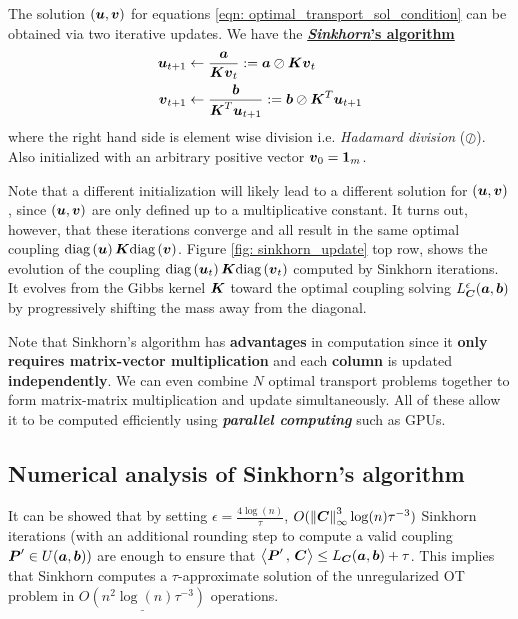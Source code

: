 \documentclass[11pt]{article}
\begin{document}
The solution $(\boldsymbol{u}, \boldsymbol{v})$ for equations \eqref{eqn: optimal_transport_sol_condition} can be obtained via two iterative updates. We have the \underline{\textbf{\emph{Sinkhorn}'s algorithm}} \citep{sinkhorn1967diagonal}
\begin{align}
\boldsymbol{u}_{t+1} &\leftarrow \frac{\boldsymbol{a}}{\boldsymbol{K}\boldsymbol{v}_{t}} := \boldsymbol{a}\oslash \boldsymbol{K}\boldsymbol{v}_{t} \label{eqn: sinkhorn_u}\\
\boldsymbol{v}_{t+1} &\leftarrow \frac{\boldsymbol{b}}{\boldsymbol{K}^{T}\boldsymbol{u}_{t+1}} :=\boldsymbol{b}\oslash \boldsymbol{K}^{T}\boldsymbol{u}_{t+1}   \label{eqn: sinkhorn_v}
\end{align} where the right hand side is element wise division i.e.  \emph{Hadamard division} ($\oslash$). Also initialized with an arbitrary positive vector $\boldsymbol{v}_{0} = \boldsymbol{1}_{m}$.  

Note that a different initialization will likely lead to a different solution for $(\boldsymbol{u}, \boldsymbol{v})$, since $(\boldsymbol{u}, \boldsymbol{v})$ are only defined up to a multiplicative constant. It turns out, however, that these iterations converge and all result in the same optimal coupling $\text{diag}\left(\boldsymbol{u}\right)\boldsymbol{K}\text{diag}\left(\boldsymbol{v}\right)$. Figure \ref{fig: sinkhorn_update} top row, shows the evolution of the coupling $\text{diag}\left(\boldsymbol{u}_{t}\right)\boldsymbol{K}\text{diag}\left(\boldsymbol{v}_{t}\right)$ computed by Sinkhorn iterations. It evolves from the Gibbs kernel $\boldsymbol{K}$ toward the optimal coupling solving  $L_{\boldsymbol{C}}^{\epsilon}(\boldsymbol{a}, \boldsymbol{b})$ by progressively shifting the mass away from the diagonal.

Note that Sinkhorn's algorithm has \textbf{advantages} in computation since it \textbf{only requires matrix-vector multiplication} and each \textbf{column} is updated \textbf{independently}. We can even combine $N$ optimal transport problems together to form matrix-matrix multiplication and update simultaneously. All of these allow it to be computed efficiently using \emph{\textbf{parallel computing}} such as GPUs. 


\subsection{Numerical analysis of Sinkhorn's algorithm}
It can be showed \citep{gabriel2019computational} that by setting $\epsilon = \frac{4 \log(n)}{\tau}$, $O(\left\|\boldsymbol{C}\right\|_{\infty}^{3}  \log(n)\tau^{-3})$ Sinkhorn iterations (with an additional rounding step to compute a valid coupling $\boldsymbol{P}' \in  U(\boldsymbol{a}, \boldsymbol{b}))$ are enough to ensure that $\left\langle \boldsymbol{P}'\,,\, \boldsymbol{C} \right\rangle \le L_{\boldsymbol{C}}(\boldsymbol{a}, \boldsymbol{b}) + \tau$.  This implies that Sinkhorn computes a $\tau$-approximate solution of the unregularized OT problem in $\underline{O(n^2 \log(n)\tau^{-3})}$ operations.
\end{document}
